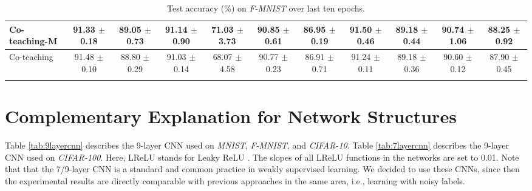 \documentclass[11pt]{article}
\begin{document}
\begin{table}[!htbp]
\begin{tabular}{l |cc|cc|cc|cc|cc}
			Co-teaching-M & \makecell{91.33\\ $\pm$\scriptsize{0.18}}&\makecell{89.05\\ $\pm$\scriptsize{0.73}} & \makecell{91.14\\ $\pm$\scriptsize{0.90}}&\makecell{71.03\\ $\pm$\scriptsize{3.73}}&\makecell{90.85\\ $\pm$\scriptsize{0.61}}&\makecell{86.95\\ $\pm$\scriptsize{0.19}}&\makecell{91.50\\ $\pm$\scriptsize{0.46}}&\makecell{89.18\\ $\pm$\scriptsize{0.44}}&\makecell{90.74\\ $\pm$\scriptsize{1.06}}&\makecell{88.25\\ $\pm$\scriptsize{0.92}}\\
			\hline 
			Co-teaching & \makecell{91.48\\ $\pm$\scriptsize{0.10}}
			& \makecell{88.80\\ $\pm$\scriptsize{0.29}}
			& \makecell{91.03\\ $\pm$\scriptsize{0.14}}
			& \makecell{68.07\\ $\pm$\scriptsize{4.58}}
			& \makecell{90.77\\ $\pm$\scriptsize{0.23}}
			& \makecell{86.91\\ $\pm$\scriptsize{0.71}}
			& \makecell{91.24\\ $\pm$\scriptsize{0.11}}
			& \makecell{89.18\\ $\pm$\scriptsize{0.36}}
            & \makecell{90.60\\ $\pm$\scriptsize{0.12}}
			& \makecell{87.90\\ $\pm$\scriptsize{0.45}}\\
		\Xhline{3\arrayrulewidth}
\end{tabular}
\caption
		{
Test accuracy (\%) on \textit{F-MNIST} over last ten epochs.
		}
	\label{tab:ablation_fmnist}
\end{table}		

\section{Complementary Explanation for Network Structures}
Table \ref{tab:9layercnn} describes the 9-layer CNN \cite{han2018co} used on \textit{MNIST}, \textit{F-MNIST}, and \textit{CIFAR-10}. Table \ref{tab:7layercnn} describes the 9-layer CNN \cite{yu2019does} used on \textit{CIFAR-100}. Here, LReLU stands for Leaky ReLU \cite{xu2015empirical}. The slopes of
all LReLU functions in the networks are set to 0.01. Note that that the 7/9-layer CNN is a standard and common practice in weakly supervised learning. We decided to use these CNNs, since then the experimental results are directly comparable with previous approaches in the same area, i.e., learning with noisy labels.
\end{document}
